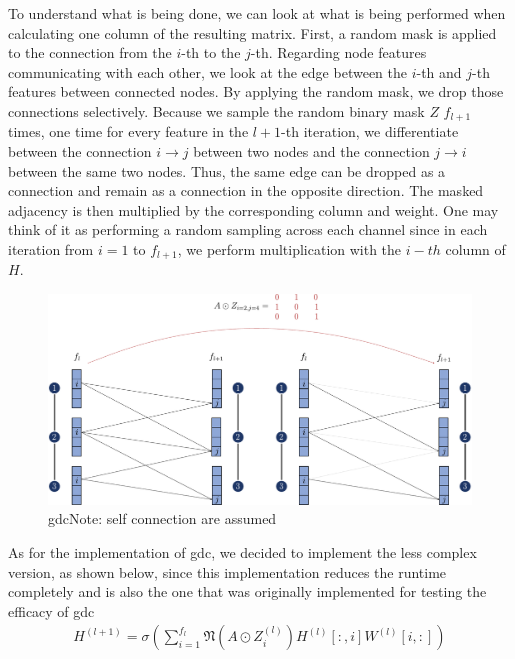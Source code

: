 To understand what is being done, we can look at what is being performed when calculating one column of the resulting matrix. First, a random mask is applied to the connection from the $i$-th to the $j$-th. Regarding node features communicating with each other, we look at the edge between the $i$-th and $j$-th features between connected nodes. By applying the random mask, we drop those connections selectively. Because we sample the random binary mask $Z$ $f_{l+1}$ times, one time for every feature in the $l+1$-th iteration, we differentiate between the connection $i \rightarrow j$ between two nodes and the connection $j \rightarrow i$ between the same two nodes. Thus, the same edge can be dropped as a connection and remain as a connection in the opposite direction. The masked adjacency is then multiplied by the corresponding column and weight.
One may think of it as performing a random sampling across each channel since in each iteration from $i=1$ to $f_{l+1}$, we perform multiplication with the $i-th$ column of $H$.

\begin{figure}[ht]
    \centering
    \includegraphics[width= 0.90\linewidth]{gfx/implementation/GDC-eq4.pdf}
    \caption{\Ac{gdc}Note: self connection are assumed}\label{fig:implementaion:GDC-eq4}
\end{figure}


As for the implementation of \ac{gdc}, we decided to implement the less complex version, as shown below, since this implementation reduces the runtime completely and is also the one that was originally implemented for testing the efficacy of \ac{gdc}
\begin{align}
    H^{(l+1)} = \sigma(\sum_{i= 1}^{f_{l}}\mathfrak{N}(A \odot Z_{i}^{(l)})H^{(l)}[:,i] W^{(l)}[i,:])
\end{align}

